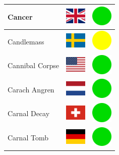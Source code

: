 \documentclass[12pt, a4paper, twoside]{report}
\begin{document}
\begin{center}
\begin{longtable}{|p{5cm}|p{2cm}|p{2cm}|}
 Cancer                                                     & \includegraphics[width=1cm]{../img/flags/gb} &   \includegraphics[width=1cm]{../likes/y} \\ \hline
 Candlemass                                                 & \includegraphics[width=1cm]{../img/flags/se} &   \includegraphics[width=1cm]{../likes/m} \\ \hline
 Cannibal Corpse                                            & \includegraphics[width=1cm]{../img/flags/us} &   \includegraphics[width=1cm]{../likes/y} \\ \hline
 Carach Angren                                              & \includegraphics[width=1cm]{../img/flags/nl} &   \includegraphics[width=1cm]{../likes/y} \\ \hline
 Carnal Decay                                               & \includegraphics[width=1cm]{../img/flags/ch} &   \includegraphics[width=1cm]{../likes/y} \\ \hline
 Carnal Tomb                                                & \includegraphics[width=1cm]{../img/flags/de} &   \includegraphics[width=1cm]{../likes/y} \\ \hline

\end{longtable}
\end{center}
\end{document}
